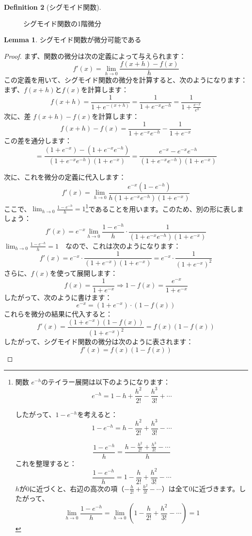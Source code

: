 \documentclass[a4paper]{jsarticle}
\theoremstyle{definition}
\newtheorem{dfn}{Definition}
\newtheorem{lem}[dfn]{Lemma}
\begin{document}
\begin{dfn}[シグモイド関数]
\begin{figure}[h]
\begin{minipage}{0.43\columnwidth}
    \caption{シグモイド関数の1階微分}
    \label{fig:p2}
  \end{minipage}
\end{figure}
\begin{lem}
シグモイド関数が微分可能である
\begin{proof}
まず、関数の微分は次の定義によって与えられます：
\[
f'(x) = \lim_{h \to 0} \frac{f(x + h) - f(x)}{h}
\]
この定義を用いて、シグモイド関数の微分を計算すると、次のようになります：\\
まず、\(f(x + h)\)と\(f(x)\)を計算します：
\[
f(x + h) = \frac{1}{1 + e^{-(x + h)}} = \frac{1}{1 + e^{-x} e^{-h}} = \frac{1}{1 + \frac{e^{-x}}{e^{h}}}
\]
次に、差 \(f(x + h) - f(x)\)を計算します：
\[
f(x + h) - f(x) = \frac{1}{1 + e^{-x} e^{-h}} - \frac{1}{1 + e^{-x}}
\]
この差を通分します：
\[
= \frac{(1 + e^{-x}) - (1 + e^{-x} e^{-h})}{(1 + e^{-x} e^{-h})(1 + e^{-x})}
= \frac{e^{-x} - e^{-x} e^{-h}}{(1 + e^{-x} e^{-h})(1 + e^{-x})}
\]

次に、これを微分の定義に代入します：
\[
f'(x) = \lim_{h \to 0} \frac{e^{-x}(1 - e^{-h})}{h(1 + e^{-x} e^{-h})(1 + e^{-x})}
\]
ここで、\(\lim_{h \to 0} \frac{1 - e^{-h}}{h} = 1\)\footnote{関数 \(e^{-h}\)のテイラー展開は以下のようになります：
\[
e^{-h} = 1 - h + \frac{h^2}{2!} - \frac{h^3}{3!} + \cdots
\]

したがって、\(1 - e^{-h}\)を考えると：
\[
1 - e^{-h} = h - \frac{h^2}{2!} + \frac{h^3}{3!} - \cdots
\]

\[
\frac{1 - e^{-h}}{h} = \frac{h - \frac{h^2}{2!} + \frac{h^3}{3!} - \cdots}{h}
\]
これを整理すると：
\[
  \frac{1 - e^{-h}}{h}= 1 - \frac{h}{2!} + \frac{h^2}{3!} - \cdots
\]
\(h\)が0に近づくと、右辺の高次の項（\(-\frac{h}{2!} + \frac{h^2}{3!} - \cdots\)）は全て0に近づきます。したがって、
\[
\lim_{h \to 0} \frac{1 - e^{-h}}{h} =\lim_{h \to 0} \left(1 - \frac{h}{2!} + \frac{h^2}{3!} - \cdots\right) = 1
\]
}であることを用います。このため、別の形に表しましょう：
\[
f'(x) = e^{-x} \lim_{h \to 0} \frac{1 - e^{-h}}{h} \cdot \frac{1}{(1 + e^{-x} e^{-h})(1 + e^{-x})}
\]
$\lim_{h \to 0} \frac{1 - e^{-h}}{h} = 1 \quad \text{なので、これは次のようになります：}$
\[
f'(x) = e^{-x} \cdot \frac{1}{(1 + e^{-x})(1 + e^{-x})} = e^{-x} \cdot \frac{1}{(1 + e^{-x})^2}
\]
さらに、\(f(x)\)を使って展開します：
\[
f(x) = \frac{1}{1 + e^{-x}} \Rightarrow 1 - f(x) = \frac{e^{-x}}{1 + e^{-x}}
\]
したがって、次のように書けます：
\[
e^{-x} = (1 + e^{-x}) \cdot (1 - f(x))
\]
これらを微分の結果に代入すると：
\[
f'(x) = \frac{(1 + e^{-x})(1 - f(x))}{(1 + e^{-x})^2} = f(x)(1 - f(x))
\]
したがって、シグモイド関数の微分は次のように表されます：
\[
f'(x) = f(x)(1 - f(x))
\]


\end{proof}
\end{lem}
\end{dfn}
\end{document}
